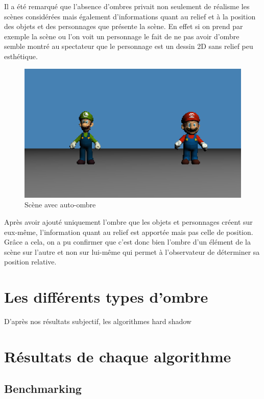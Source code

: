 \documentclass[a4paper,10pt]{report}
\begin{document}
Il a été remarqué que l'absence d'ombres privait non seulement de réalisme les scènes considérées mais également d'informations quant au relief et à la position des objets et des personnages que présente la scène. En effet si on prend par exemple la scène ou l'on voit un personnage le fait de ne pas avoir d'ombre semble montré au spectateur que le personnage est un dessin 2D sans relief peu esthétique.

\begin{figure}[H]
\includegraphics[scale=0.5]{images/autoombre.png}
\centering
\caption{Scène avec auto-ombre}
\end{figure}

Après avoir ajouté uniquement l'ombre que les objets et personnages créent sur eux-même, l'information quant au relief est apportée mais pas celle de position. Gr\^ace a cela, on a pu confirmer que c'est donc bien l'ombre d'un élément de la scène sur l'autre et non sur lui-même qui permet à l'observateur de déterminer sa position relative.

\section{Les différents types d'ombre}

D'après nos résultats subjectif, les algorithmes hard shadow

\section{Résultats de chaque algorithme}

\subsection{Benchmarking}
\end{document}
